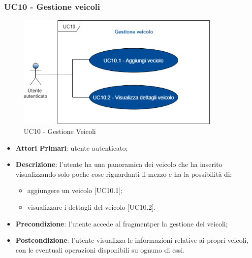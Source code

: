  \subsubsection{UC10 - Gestione veicoli}
  \begin{figure}[H]
 	\includegraphics[width=10cm]{res/images/UC10Gestioneveicolo.png}
 	\centering
 	\caption{UC10 - Gestione Veicoli}
 \end{figure}
 \begin{itemize}
 	\item \textbf{Attori Primari}: utente autenticato;
 	\item \textbf{Descrizione}: l'utente ha una panoramica dei veicolo che ha inserito visualizzando solo poche cose riguardanti il mezzo e ha la possibilità di:
 	\begin{itemize}
 		\item aggiungere un veicolo [UC10.1];
 		\item visualizzare i dettagli del veicolo [UC10.2].
 	\end{itemize}
 	\item \textbf{Precondizione}: l'utente accede al fragment\glosp per la gestione dei veicoli;
 	\item \textbf{Postcondizione}: l'utente visualizza le informazioni relative ai propri veicoli, con le eventuali operazioni disponibili su ognuno di essi.
 \end{itemize}
